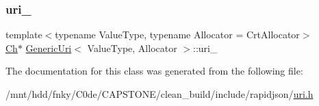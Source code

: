 \mbox{\label{classGenericUri_a41d10afd782236002b18b8cb681a2e3f}} 
\subsubsection{\texorpdfstring{uri\+\_\+}{uri\_}}
{\footnotesize\ttfamily template$<$typename Value\+Type, typename Allocator = Crt\+Allocator$>$ \\
\hyperlink{classGenericUri_a20d0602cff62211d89bc4b25963beeee}{Ch}$\ast$ \hyperlink{classGenericUri}{Generic\+Uri}$<$ Value\+Type, Allocator $>$\+::uri\+\_\+\hspace{0.3cm}{\ttfamily [private]}}



The documentation for this class was generated from the following file\+:\begin{DoxyCompactItemize}
\item 
/mnt/hdd/fnky/\+C0de/\+C\+A\+P\+S\+T\+O\+N\+E/clean\+\_\+build/include/rapidjson/\hyperlink{uri_8h}{uri.\+h}\end{DoxyCompactItemize}
